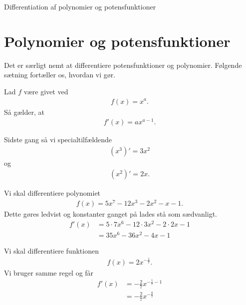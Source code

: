 \begin{center}
\Huge
Differentiation af polynomier og potensfunktioner
\end{center}
\section*{Polynomier og potensfunktioner}

Det er særligt nemt at differentiere potensfunktioner og polynomier. Følgende sætning fortæller os, hvordan vi gør.

\begin{setn}
	Lad $f$ være givet ved
	\begin{align*}
		f(x) = x^a.
	\end{align*}
	Så gælder, at 
	\begin{align*}
		f'(x) = ax^{a-1}.
	\end{align*}
\end{setn}

Sidste gang så vi specialtilfældende 
\begin{align*}
	(x^3)' = 3x^2
\end{align*}
og 
\begin{align*}
	(x^2)' = 2x.
\end{align*}

\begin{exa}
	Vi skal differentiere polynomiet 
	\begin{align*}
		f(x) = 5x^7-12x^3-2x^2-x-1.
	\end{align*}
	Dette gøres ledvist og konstanter ganget på lades stå som sædvanligt.
	\begin{align*}
		f'(x) &= 5\cdot 7x^6 - 12\cdot 3x^2-2\cdot 2x-1\\
		&= 35x^6-36x^2-4x-1
	\end{align*}
\end{exa}

\begin{exa}
	Vi skal differentiere funktionen 
	\begin{align*}
		f(x) = 2x^{-\frac{1}{7}}.
	\end{align*}
	Vi bruger samme regel og får
	\begin{align*}
	 	f'(x) &= -\frac{2}{7}x^{-\frac{1}{7}-1} \\
	 	&= -\frac{2}{7}x^{-\frac{8}{7}}
	\end{align*}
\end{exa}

